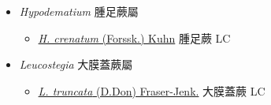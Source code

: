 
  \begin{itemize}
 \item[    ] \textit{Hypodematium} 腫足蕨屬
                                
  \begin{itemize}
        \item[] \href{http://www.theplantlist.org/tpl1.1/search?q=Hypodematium+crenatum}{\textit{H. crenatum} (Forssk.) Kuhn}   腫足蕨   LC
  \end{itemize}
 \item[    ] \textit{Leucostegia} 大膜蓋蕨屬
                                
  \begin{itemize}
        \item[] \href{http://www.theplantlist.org/tpl1.1/search?q=Leucostegia+truncata}{\textit{L. truncata} (D.Don) Fraser-Jenk.}   大膜蓋蕨   LC
  \end{itemize}
  \end{itemize}
